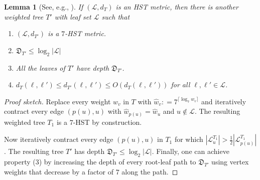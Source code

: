 \documentclass[11pt]{article}
\numberwithin{equation}{section}
\newtheorem{lemma}[theorem]{Lemma}
\theoremstyle{definition}
\theoremstyle{plain}
\newcommand{\calL}{\mathcal L}
\newcommand{\depth}{\mathfrak{D}}
\newcommand{\seteq}{\mathrel{\mathop:}=}
\begin{document}
%
\begin{lemma}[{See, e.g., \cite[Thm. 2.4]{BBMN15}}]%
	If $(\calL,d_T)$ is an HST metric, then there is another weighted tree $T'$ with leaf set $\calL$
	such that
	\begin{enumerate}
		\item $(\calL,d_{T'})$ is a $7$-HST metric.
		\item  $\depth_{T'} \leq \log_2 |\calL|$
		\item All the leaves of $T'$ have depth $\depth_{T'}$.
		\item $d_T(\ell,\ell') \leq d_{T'}(\ell,\ell') \leq O(d_T(\ell,\ell'))$ for all $\ell,\ell' \in \calL$.
	\end{enumerate}
\end{lemma}
\begin{proof}[Proof sketch]
	Replace every weight $w_v$ in $T$ with $\hat{w}_v \seteq 7^{\lceil \log_7 w_v\rceil}$ and iteratively contract every edge $(p(u),u)$
	with $\hat{w}_{p(u)}=\hat{w}_u$ and $u \notin \calL$.
	The resulting weighted tree $T_1$ is a $7$-HST by construction.
	
	Now iteratively contract every edge $(p(u),u)$ in $T_1$ for which $|\calL^{T_1}_{u}| > \frac12 |\calL^{T_1}_{p(u)}|$.
	The resulting tree $T'$ has depth $\depth_{T'} \leq \log_2 |\calL|$.
	Finally, one can achieve property (3) by increasing the depth of every root-leaf path to $\depth_{T'}$
	using vertex weights that decrease by a factor of $7$ along the path.
\end{proof}
\end{document}
